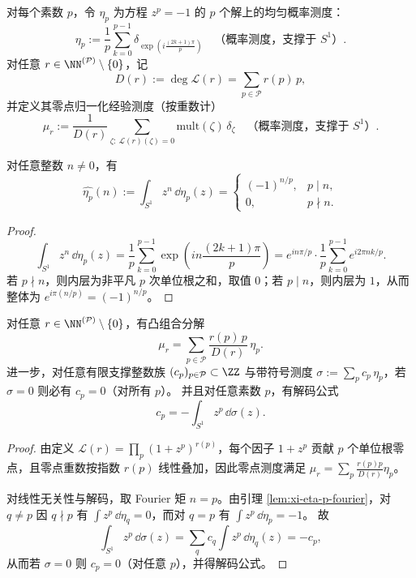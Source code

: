 \begin{definition}[素数根均匀测度与零点经验测度]\label{def:xi-leyang-prime-root-measures}
对每个素数 \(p\)，令 \(\eta_p\) 为方程 \(z^p=-1\) 的 \(p\) 个解上的均匀概率测度：
\[
\eta_p:=\frac1p\sum_{k=0}^{p-1}\delta_{\exp\!\left(i\frac{(2k+1)\pi}{p}\right)}
\quad\text{（概率测度，支撑于 \(S^1\)）}.
\]
对任意 \(r\in\NN^{(\mathcal P)}\setminus\{0\}\)，记
\[
D(r):=\deg \mathcal L(r)=\sum_{p\in\mathcal P}r(p)\,p,
\]
并定义其零点归一化经验测度（按重数计）
\[
\mu_r:=\frac1{D(r)}\sum_{\zeta:\ \mathcal L(r)(\zeta)=0}\mathrm{mult}(\zeta)\,\delta_\zeta
\quad\text{（概率测度，支撑于 \(S^1\)）}.
\]
\end{definition}

\begin{lemma}\label{lem:xi-eta-p-fourier}
对任意整数 \(n\neq 0\)，有
\[
\widehat{\eta_p}(n):=\int_{S^1}z^n\,\dd\eta_p(z)=
\begin{cases}
(-1)^{n/p},&p\mid n,\\
0,&p\nmid n.
\end{cases}
\]
\end{lemma}
\begin{proof}
\[
\int_{S^1}z^n\,\dd\eta_p(z)
=\frac1p\sum_{k=0}^{p-1}\exp\!\left(i n\frac{(2k+1)\pi}{p}\right)
=e^{i n\pi/p}\cdot \frac1p\sum_{k=0}^{p-1}e^{i2\pi nk/p}.
\]
若 \(p\nmid n\)，则内层为非平凡 \(p\) 次单位根之和，取值 \(0\)；若 \(p\mid n\)，则内层为 \(1\)，从而整体为 \(e^{i\pi(n/p)}=(-1)^{n/p}\)。
\end{proof}

\begin{proposition}[零点测度的素数分解与单频谱解码]\label{prop:xi-leyang-prime-measure-linear-independence-decoding}
对任意 \(r\in\NN^{(\mathcal P)}\setminus\{0\}\)，有凸组合分解
\[
\mu_r=\sum_{p\in\mathcal P}\frac{r(p)\,p}{D(r)}\,\eta_p.
\]
进一步，对任意有限支撑整数族 \((c_p)_{p\in\mathcal P}\subset\ZZ\) 与带符号测度
\(
\sigma:=\sum_pc_p\,\eta_p
\)，若 \(\sigma=0\) 则必有 \(c_p=0\)（对所有 \(p\)）。
并且对任意素数 \(p\)，有解码公式
\[
c_p=-\int_{S^1}z^p\,\dd\sigma(z).
\]
\end{proposition}
\begin{proof}
由定义 \(\mathcal L(r)=\prod_p(1+z^p)^{r(p)}\)，每个因子 \(1+z^p\) 贡献 \(p\) 个单位根零点，且零点重数按指数 \(r(p)\) 线性叠加，因此零点测度满足
\(
\mu_r=\sum_p\frac{r(p)p}{D(r)}\eta_p
\)。
\par
对线性无关性与解码，取 Fourier 矩 \(n=p\)。由引理 \ref{lem:xi-eta-p-fourier}，对 \(q\neq p\) 因 \(q\nmid p\) 有
\(
\int z^p\,\dd\eta_q=0
\)，而对 \(q=p\) 有
\(
\int z^p\,\dd\eta_p=-1
\)。
故
\[
\int_{S^1}z^p\,\dd\sigma(z)=\sum_q c_q\int z^p\,\dd\eta_q(z)=-c_p,
\]
从而若 \(\sigma=0\) 则 \(c_p=0\)（对任意 \(p\)），并得解码公式。
\end{proof}

